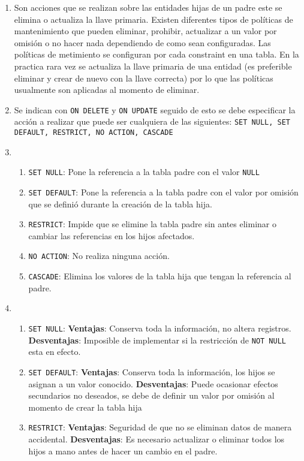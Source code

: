 \documentclass{exam}
\begin{document}
	\begin{enumerate}
		\item Son acciones que se realizan sobre las entidades hijas de un padre este se elimina o actualiza la llave primaria. Existen diferentes tipos de políticas de mantenimiento que pueden eliminar, prohibir, actualizar a un valor por omisión o no hacer nada dependiendo de como sean configuradas. Las políticas de metimiento se configuran por cada constraint en una tabla. En la practica rara vez se actualiza la llave primaria de una entidad (es preferible eliminar y crear de nuevo con la llave correcta) por lo que las políticas usualmente son aplicadas al momento de eliminar.
		\item Se indican con \texttt{ON DELETE} y \texttt{ON UPDATE} seguido de esto se debe especificar la acción a realizar que puede ser cualquiera de las siguientes: \texttt{SET NULL, SET DEFAULT, RESTRICT, NO ACTION, CASCADE}
		\item \begin{enumerate}
			\item \texttt{SET NULL}: Pone la referencia a la tabla padre con el valor \texttt{NULL}
			\item \texttt{SET DEFAULT}: Pone la referencia a la tabla padre con el valor por omisión que se definió durante la creación de la tabla hija.
			\item \texttt{RESTRICT}: Impide que se elimine la tabla padre sin antes eliminar o cambiar las referencias en los hijos afectados.
			\item \texttt{NO ACTION}: No realiza ninguna acción.
			\item \texttt{CASCADE}: Elimina los valores de la tabla hija que tengan la referencia al padre.
		\end{enumerate}
		\item \begin{enumerate}
			\item \texttt{SET NULL}: \textbf{Ventajas}: Conserva toda la información, no altera registros. \textbf{Desventajas}: Imposible de implementar si la restricción de \texttt{NOT NULL} esta en efecto.
			\item \texttt{SET DEFAULT}: \textbf{Ventajas}: Conserva toda la información, los hijos se asignan a un valor conocido. \textbf{Desventajas}: Puede ocasionar efectos secundarios no deseados, se debe de definir un valor por omisión al momento de crear la tabla hija
			\item \texttt{RESTRICT}: \textbf{Ventajas}: Seguridad de que no se eliminan datos de manera accidental. \textbf{Desventajas}: Es necesario actualizar o eliminar todos los hijos a mano antes de hacer un cambio en el padre.

\end{enumerate}
\end{enumerate}
\end{document}
